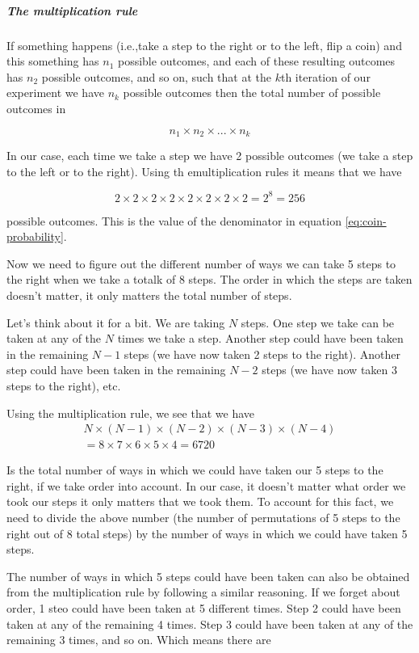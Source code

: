 \subparagraph{The multiplication rule}
If something happens (i.e.,take a step to the right or to the left, flip a coin) and this something has $n_1$ possible outcomes, and each of these resulting outcomes has $n_2$ possible outcomes, and so on, such that at the $k$th iteration of our experiment we have $n_k$ possible outcomes then the total number of possible outcomes in

$$
n_1 \times n_2 \times ... \times n_k
$$

In our case, each time we take a step we have 2 possible outcomes (we take a step to the left or to the right).
Using th emultiplication rules it means that we have

$$
2 \times 2 \times
2 \times 2 \times
2 \times 2 \times
2 \times 2
= 2^8 = 256
$$

possible outcomes.
This is the value of the denominator in equation \eqref{eq:coin-probability}.

Now we need to figure out the different number of ways we can take 5 steps to the right when we take a totalk of 8 steps.
The order in which the steps are taken doesn't matter, it only matters the total number of steps.

Let's think about it for a bit.
We are taking $N$ steps.
One step we take can be taken at any of the $N$ times we take a step.
Another step could have been taken in the remaining $N-1$ steps (we have now taken 2 steps to the right).
Another step could have been taken in the remaining $N-2$ steps (we have now taken 3 steps to the right), etc.

Using the multiplication rule, we see that we have 
\begin{align}
N \times 
\left( N-1 \right) \times
\left( N-2 \right) \times 
\left( N-3 \right) \times
\left( N-4 \right) \label{eq:permutation} \\
= 8 \times 7 \times 6 \times 5 \times 4 = 6720 \label{eq:permutation-result}
\end{align}

Is the total number of ways in which we could have taken our 5 steps to the right, if we take order into account.
In our case, it doesn't matter what order we took our steps it only matters that we took them.
To account for this fact, we need to divide the above number (the number of permutations of 5 steps to the right out of 8 total steps) by the number of ways in which we could have taken 5 steps.

The number of ways in which 5 steps could have been taken can also be obtained from the multiplication rule by following a similar reasoning.
If we forget about order, 1 steo could have been taken at 5 different times.
Step 2 could have been taken at any of the remaining 4 times.
Step 3 could have been taken at any of the remaining 3 times, and so on.
Which means there are

